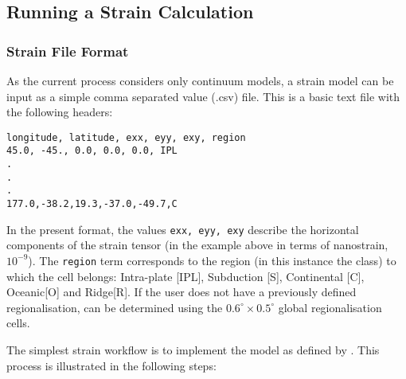  
 \subsection{Running a Strain Calculation}
 \subsubsection{Strain File Format}
 
 As the current process considers only continuum models, a strain model can be input as a simple comma separated value (.csv) file. This is a basic text file with the following headers:
 
\begin{Verbatim}[frame=single, commandchars=\\\{\}, fontsize=\scriptsize]
longitude, latitude, exx, eyy, exy, region
45.0, -45., 0.0, 0.0, 0.0, IPL
.
.
.
177.0,-38.2,19.3,-37.0,-49.7,C
\end{Verbatim}

In the present format, the values \verb=exx, eyy, exy= describe the horizontal components of the strain tensor (in the example above in terms of nanostrain, $10^{-9}$). The \verb=region= term corresponds to the region (in this instance the \textcite{Kreemer_etal2003} class) to which the cell belongs: Intra-plate [IPL], Subduction [S], Continental [C], Oceanic[O] and Ridge[R]. If the user does not have a previously defined regionalisation, can be determined using the $0.6^{\circ} \times 0.5^{\circ}$ global regionalisation cells.

The simplest strain workflow is to implement the model as defined by \textcite{Bird_etal2010}. This process is illustrated in the following steps:


